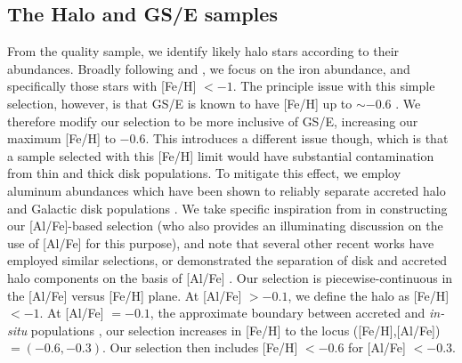 \subsection{The Halo and GS/E samples}
\label{ch3:subsec:halo-gse-samples}

From the quality sample, we identify likely halo stars according to their abundances. Broadly following \cite{mackereth20} and \cite{lane22}, we focus on the iron abundance, and specifically those stars with [Fe/H] $< -1$. The principle issue with this simple selection, however, is that GS/E is known to have [Fe/H] up to $\sim -0.6$ \parencite[e.g.][]{myeong19,monty20,hasselquist21,horta23a}. We therefore modify our selection to be more inclusive of GS/E, increasing our maximum [Fe/H] to $-0.6$. This introduces a different issue though, which is that a sample selected with this [Fe/H] limit would have substantial contamination from thin and thick disk populations. To mitigate this effect, we employ aluminum abundances which have been shown to reliably separate accreted halo and Galactic disk populations \parencite{hawkins15}. We take specific inspiration from \textcite{belokurov22} in constructing our [Al/Fe]-based selection (who also provides an illuminating discussion on the use of [Al/Fe] for this purpose), and note that several other recent works have employed similar selections, or demonstrated the separation of disk and accreted halo components on the basis of [Al/Fe] \parencite{das20,hasselquist21,horta23a}. Our selection is piecewise-continuous in the [Al/Fe] versus [Fe/H] plane. At [Al/Fe] $> -0.1$, we define the halo as [Fe/H] $< -1$. At [Al/Fe] $= -0.1$, the approximate boundary between accreted and \textit{in-situ} populations \parencite{hawkins15,das20,hasselquist21}, our selection increases in [Fe/H] to the locus ([Fe/H],[Al/Fe]) $= (-0.6,-0.3)$. Our selection then includes [Fe/H] $< -0.6$ for [Al/Fe] $< -0.3$.

